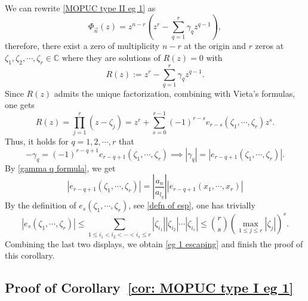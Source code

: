 \documentclass[a4paper,10pt,leqno]{amsart}
\numberwithin{equation}{section}
\theoremstyle{remark}
\newcommand{\C}{\mathbb{C}}
\begin{document}
We can rewrite \eqref{MOPUC type II eg 1} as
\[
\Phi_{\vec{n}}(z) = z^{n-r} \left( z^r - \sum_{q=1}^r \gamma_q z^{q-1} \right),
\]
therefore, there exist a zero of multiplicity $n-r$ at the origin and $r$ zeros at $\zeta_1, \zeta_2, \cdots, \zeta_r \in \C$ where they are solutions of $R(z) = 0$ with
\[
R(z) := z^r - \sum_{q=1}^r \gamma_q z^{q-1}.
\]
Since $R(z)$ admits the unique factorization, combining with Vieta's formulas, one gets
\[
R(z) = \prod_{j=1}^r (z - \zeta_j) = z^r + \sum_{s = 0}^{r-1} (-1)^{r-s} e_{r-s}(\zeta_1, \cdots, \zeta_r) z^s.
\]
Thus, it holds for $q = 1, 2, \cdots, r$ that
\[
-\gamma_{q} = (-1)^{r-q+1} e_{r-q+1} (\zeta_1, \cdots, \zeta_r) \implies |\gamma_q| = |e_{r-q+1} (\zeta_1, \cdots, \zeta_r)|.
\]
By \eqref{gamma q formula}, we get
\[
|e_{r-q+1} (\zeta_1, \cdots, \zeta_r)| = \left| \frac{a_n}{a_{l_q}} \right| |e_{r-q+1} (x_1, \cdots, x_r)|
\]
By the definition of $e_s(\zeta_1, \cdots, \zeta_r)$, see \eqref{defn of esp}, one has trivially
\[
|e_s(\zeta_1, \cdots, \zeta_r)| \leq \sum_{1 \leq i_1 < i_2 < \cdots < i_s \leq r} |\zeta_{i_1}| |\zeta_{i_2}| \cdots |\zeta_{i_s}| \leq \binom{r}{s} \left( \max_{1\leq j \leq r} |\zeta_j| \right)^s.
\]
Combining the last two displays, we obtain \eqref{eg 1 escaping} and finish the proof of this corollary.


\subsection{Proof of Corollary~\ref{cor: MOPUC type I eg 1}}
\end{document}
